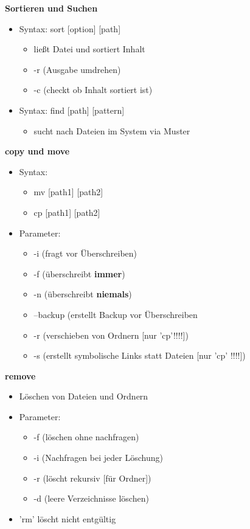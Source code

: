 \documentclass{article}
\begin{document}
\textbf{Sortieren und Suchen}
\begin{itemize}
	\item Syntax: sort [option] [path]
	\begin{itemize}
		\item ließt Datei und sortiert Inhalt
		\item -r (Ausgabe umdrehen)
		\item -c (checkt ob Inhalt sortiert ist)
	\end{itemize}
	\item Syntax: find [path] [pattern]
	\begin{itemize}
		\item sucht nach Dateien im System via Muster
	\end{itemize}
\end{itemize}

\textbf{copy und move}
\begin{itemize}
	\item Syntax:
	\begin{itemize}
		\item mv [path1] [path2]
		\item cp [path1] [path2]
	\end{itemize}
	\item Parameter:
	\begin{itemize}
		\item -i (fragt vor Überschreiben)
		\item -f (überschreibt \textbf{immer})
		\item -n (überschreibt \textbf{niemals})
		\item --backup (erstellt Backup vor Überschreiben
		\item -r (verschieben von Ordnern [nur 'cp'!!!!])
		\item -s (erstellt symbolische Links statt Dateien [nur 'cp' !!!!])
	\end{itemize}
\end{itemize}

\textbf{remove}
\begin{itemize}
	\item Löschen von Dateien und Ordnern
	\item Parameter:	
	\begin{itemize}
		\item -f (löschen ohne nachfragen)
		\item -i (Nachfragen bei jeder Löschung)
		\item -r (löscht rekursiv [für Ordner])
		\item -d (leere Verzeichnisse löschen)
	\end{itemize}
	\item 'rm' löscht nicht entgültig
\end{itemize}
\end{document}
